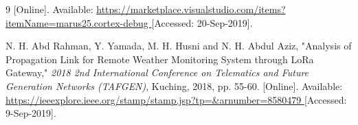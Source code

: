\begin{thebibliography}{9}
[Online]. Available:
\url{
https://marketplace.visualstudio.com/items?itemName=marus25.cortex-debug
}
[Accessed: 20-Sep-2019].
































































N. H. Abd Rahman, Y. Yamada, M. H. Husni and N. H. Abdul Aziz, "Analysis of Propagation Link for Remote Weather Monitoring System through LoRa Gateway," \textit{2018 2nd International Conference on Telematics and Future Generation Networks (TAFGEN)}, Kuching, 2018, pp. 55-60.
[Online]. Available:
\url{
https://ieeexplore.ieee.org/stamp/stamp.jsp?tp=&arnumber=8580479
}
[Accessed: 9-Sep-2019].





\end{thebibliography}
